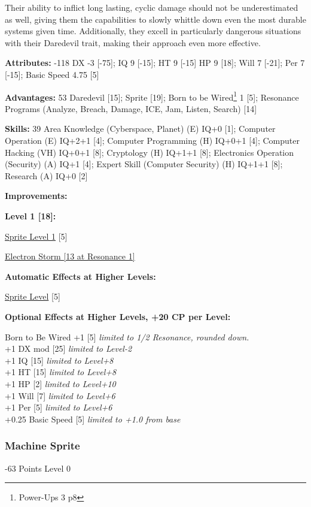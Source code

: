 \begin{multicols*}{3}
Their ability to inflict long lasting, cyclic damage should not be underestimated as well, giving them the capabilities to slowly whittle down even the most durable systems given time. Additionally, they excell in particularly dangerous situations with their Daredevil trait, making their approach even more effective.

\textbf{Attributes:} -118
DX -3 [-75]; IQ 9 [-15]; HT 9 [-15]
HP 9 [18]; Will 7 [-21]; Per 7 [-15]; Basic Speed 4.75 [5]

\textbf{Advantages:} 53
Daredevil [15]; Sprite [19]; Born to be Wired\footnote{Power-Ups 3 p8} 1 [5]; Resonance Programs (Analyze, Breach, Damage, ICE, Jam, Listen, Search) [14]

\textbf{Skills:} 39
Area Knowledge (Cyberspace, Planet) (E) IQ+0 [1]; Computer Operation (E) IQ+2+1 [4]; Computer Programming (H) IQ+0+1 [4]; Computer Hacking (VH) IQ+0+1 [8]; Cryptology (H) IQ+1+1 [8]; Electronics Operation (Security) (A) IQ+1 [4]; Expert Skill (Computer Security) (H) IQ+1+1 [8]; Research (A) IQ+0 [2]

\textbf{ Improvements:}

\textbf{Level 1 [18]:}

\hyperref[sprite_level]{Sprite Level 1} [5]

\hyperref[electron_storm]{Electron Storm [13 at Resonance 1]}

\textbf{Automatic Effects at Higher Levels:}

\hyperref[sprite_level]{Sprite Level} [5]

\textbf{Optional Effects at Higher Levels, +20 CP per Level:}

Born to Be Wired +1 [5] \textit{limited to 1/2 Resonance, rounded down.}\\
+1 DX mod [25] \textit{limited to Level-2}\\
+1 IQ [15] \textit{limited to Level+8}\\
+1 HT [15] \textit{limited to Level+8}\\
+1 HP [2] \textit{limited to Level+10}\\
+1 Will [7] \textit{limited to Level+6}\\
+1 Per [5] \textit{limited to Level+6}\\
+0.25 Basic Speed [5] \textit{limited to +1.0 from base}\\


\subsubsection{Machine Sprite}
\begin{flushright}
	-63 Points Level 0
\end{flushright}


\end{multicols*}
